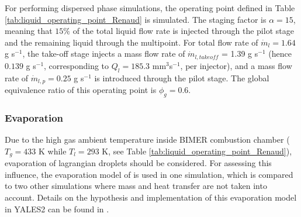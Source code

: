 For performing dispersed phase simulations, the operating point defined in Table \ref{tab:liquid_operating_point_Renaud} is simulated. The staging factor is $\alpha = 15$, meaning that $15 \%$ of the total liquid flow rate is injected through the pilot stage and the remaining liquid through the multipoint. For total flow rate of $\dot{m}_l = 1.64$ g s$^{-1}$, the take-off stage injects a mass flow rate of $\dot{m}_{l,takeoff}$ = 1.39 g s$^{-1}$ (hence $0.139$ g s$^{-1}$, corresponding to $Q_l = 185.3$ mm$^3$s$^{-1}$,  per injector), and a mass flow rate of $\dot{m}_{l,p} = 0.25$ g s$^{-1}$ is introduced through the pilot stage. The global equivalence ratio of this operating point is $\phi_g = 0.6$.

\subsubsection*{Evaporation}

Due to the high gas ambient temperature inside BIMER combustion chamber ($T_g = 433$ K while $T_l = 293$ K, see Table \ref{tab:liquid_operating_point_Renaud}), evaporation of lagrangian droplets should be considered. For assessing this influence, the evaporation model of  is used in one simulation, which is compared to two other simulations where mass and heat transfer are not taken into account. Details on the hypothesis and implementation of this evaporation model in YALES2 can be found in .


